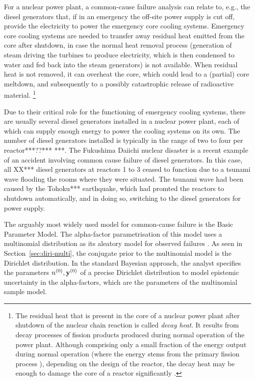 For a nuclear power plant, a common-cause failure analysis can relate to, e.g.,
the diesel generators that, if in an emergency the off-site power supply is cut off,
provide the electricity to power the emergency core cooling systems.
Emergency core cooling systems are needed to transfer away residual heat emitted from the core after shutdown,
in case the normal heat removal process
(generation of steam driving the turbines to produce electricity,
which is then condensed to water and fed back into the steam generators)
is not available.
When residual heat is not removed, it can overheat the core,
which could lead to a (partial) core meltdown,
and subsequently to a possibly catastrophic release of radioactive material.%
\footnote{The residual heat that is present in the core of a nuclear power plant
after shutdown of the nuclear chain reaction is called \emph{decay heat}.
It results from decay processes of fission products produced during normal operation of the power plant.
Although comprising only a small fraction of the energy output during normal operation
(where the energy stems from the primary fission process \cite[Module~4, p.~33]{united1993doe}),
depending on the design of the reactor,
the decay heat may be enough to damage the core of a reactor significantly
\cite[p.~VIII-9 and VIII-25f]{1975:reactor:safety:study}.}

Due to their critical role for the functioning of emergency cooling systems,
there are usually several diesel generators installed in a nuclear power plant,
each of which can supply enough energy to power the cooling systems on its own.
The number of diesel generators installed is typically in the range of two to four per reactor***??***
\cite[p.~31]{2011:iaea::report} ***.
The Fukushima Daiichi nuclear disaster is a recent example of an accident
involving common cause failure of diesel generators.
In this case, all XX*** diesel generators at reactors 1 to 3 
ceased to function due to a tsunami wave flooding the rooms where they were situated.
The tsunami wave had been caused by the Tohoku*** earthquake,
which had promted the reactors to shutdown automatically, and in doing so,
switching to the diesel generators for power supply.

The arguably most widely used model for common-cause failure is the Basic Parameter Model.
The alpha-factor parametrisation of this model uses a multinomial distribution
as its aleatory model for observed failures \cite{1988:mosleh::common:cause}. 
As seen in Section~\ref{sec:diri-multi}, the conjugate prior to the multinomial model is the Dirichlet distribution.
In the standard Bayesian approach, the analyst specifies the parameters $n^{(0)}, \mathbf{y}^{(0)}$ of a precise Dirichlet distribution
to model epistemic uncertainty in the alpha-factors, which are the parameters of the multinomial sample model.


